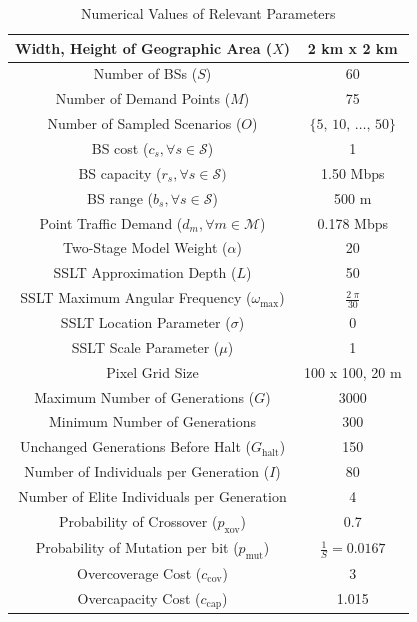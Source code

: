 \documentclass[conference]{IEEEtran}
\begin{document}
\begin{table}
\vspace{0.25in}
\centering
\caption{Numerical Values of Relevant Parameters}
\begin{tabular}{|c|c|} 
\hline
Width, Height of Geographic Area ($X$) & 2 km x 2 km \\
\hline
Number of BSs ($S$) & 60 \\ 
\hline 
Number of Demand Points ($M$) & 75 \\ 
\hline 
Number of Sampled Scenarios ($O$) & $\{5,\, 10,\, \ldots,\, 50\}$ \\ 
\hline 
BS cost ($c_s, \forall s \in \mathcal{S}$) & 1 \\ 
\hline 
BS capacity ($r_s, \forall s \in \mathcal{S})$ & 1.50 Mbps \\ 
\hline
BS range ($b_s, \forall s \in \mathcal{S}$) & 500 m \\
\hline 
Point Traffic Demand ($d_m, \forall m \in \mathcal{M}$) & 0.178 Mbps \\ 
\hline 
Two-Stage Model Weight ($\alpha$) & 20\\ 
\hline 
\hline
SSLT Approximation Depth ($L$) & 50 \\ 
\hline
SSLT Maximum Angular Frequency ($\omega_{\max}$) & $\frac{2 \; \pi}{30}$ \\
\hline 
SSLT Location Parameter ($\sigma$) & 0 \\ 
\hline 
SSLT Scale Parameter ($\mu$) & 1 \\ 
\hline
Pixel Grid Size & 100 x 100, 20 m \\
\hline 
\hline
Maximum Number of Generations ($G$) & 3000 \\ 
\hline
Minimum Number of Generations & 300 \\
\hline
Unchanged Generations Before Halt ($G_\text{halt}$) & 150 \\
\hline 
Number of Individuals per Generation ($I$) & 80 \\ 
\hline
Number of Elite Individuals per Generation & 4 \\
\hline 
Probability of Crossover ($p_\text{xov}$) & 0.7 \\ 
\hline
Probability of Mutation per bit ($p_\text{mut}$) & $\frac{1}{S} = 0.0167$ \\
\hline 
Overcoverage Cost ($c_\text{cov}$) & 3 \\
\hline
Overcapacity Cost ($c_\text{cap}$) & 1.015 \\
\hline
\end{tabular}
\label{tab:simval}
\end{table}
\end{document}
